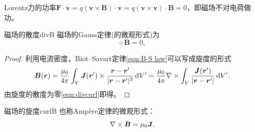 \begin{corollary}
    Lorentz力的功率$\bm F \cdot \bm v = q(\bm v \times \bm B) \cdot \bm v = q(\bm v \times \bm v) \cdot \bm B = 0$，即磁场不对电荷做功。
\end{corollary}


\begin{theorem}
    {磁场的散度}{divB}
    磁场的Gauss定律(的微观形式)为
    \begin{equation}
        \label{eqn:divB}
        \div\bm B = 0,
    \end{equation}
\end{theorem}

\begin{proof}
    利用电流密度，Biot--Savart定律\eqref{eqn:B-S law}可以写成旋度的形式
    \begin{equation}
        \label{eqn:B(r)}
        \bm B(\bm r) = \frac{\mu_0}{4\pi}\int_V\bm J(\bm r') \times \frac{\bm r - \bm r'}{\lvert\bm r - \bm r'\rvert^3}\mathop{}\!\mathrm{d} V'
        = \frac{\mu_0}{4\pi}\nabla\times\int_V\frac{\bm J(\bm r')}{\lvert\bm r - \bm r'\rvert}\mathop{}\!\mathrm{d} V'.
    \end{equation}
    由旋度的散度为零\eqref{eqn:divcurl}即得。
\end{proof}

\begin{theorem}
    {磁场的旋度}{curlB}
    也称Ampère定律的微观形式：
    \begin{equation}
        \label{eqn:curlB}
        \nabla\times\bm B = \mu_0\bm J.
    \end{equation}
\end{theorem}

